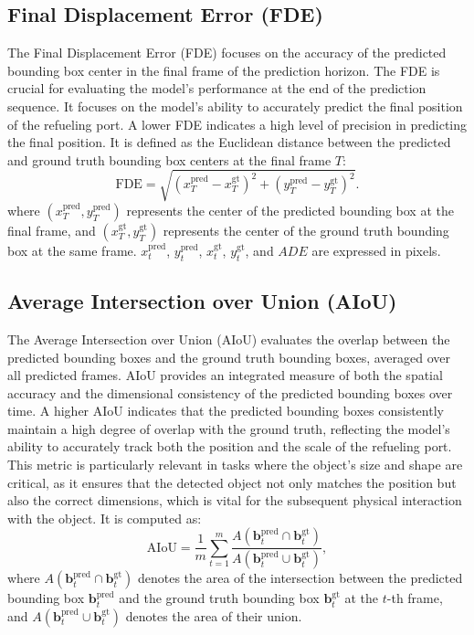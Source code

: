 \documentclass[12pt,oneside]{book} %
\begin{document}
\subsection*{Final Displacement Error (FDE)}
\noindent The Final Displacement Error (FDE) focuses on the accuracy of the predicted
bounding box center in the final frame of the prediction horizon. The FDE is
crucial for evaluating the model’s performance at the end of the prediction
sequence. It focuses on the model’s ability to accurately predict the final
position of the refueling port. A lower FDE indicates a high level of precision
in predicting the final position. It is defined as the Euclidean distance
between the predicted and ground truth bounding box centers at the final frame
\(T\):
\begin{equation}
    \text{FDE} = \sqrt{(x_T^{\text{pred}} - x_T^{\text{gt}})^2 + (y_T^{\text{pred}} - y_T^{\text{gt}})^2}.
\end{equation}
where \((x_T^{\text{pred}}, y_T^{\text{pred}})\) represents the center of the predicted bounding box at the final frame, and \((x_T^{\text{gt}}, y_T^{\text{gt}})\) represents the center of the ground truth bounding box at the same frame.  \(x_t^{\text{pred}}\), \(y_t^{\text{pred}}\), \(x_t^{\text{gt}}\), \(y_t^{\text{gt}}\), and \(ADE\) are expressed in pixels.

\newpage
\subsection*{Average Intersection over Union (AIoU)}
\noindent The Average Intersection over Union (AIoU) evaluates the overlap between the
predicted bounding boxes and the ground truth bounding boxes, averaged over all
predicted frames. AIoU provides an integrated measure of both the spatial
accuracy and the dimensional consistency of the predicted bounding boxes over
time. A higher AIoU indicates that the predicted bounding boxes consistently
maintain a high degree of overlap with the ground truth, reflecting the model’s
ability to accurately track both the position and the scale of the refueling
port. This metric is particularly relevant in tasks where the object’s size and
shape are critical, as it ensures that the detected object not only matches the
position but also the correct dimensions, which is vital for the subsequent
physical interaction with the object. It is computed as:
\begin{equation}
    \text{AIoU} = \frac{1}{m} \sum_{t=1}^{m} \frac{A(\mathbf{b}_t^{\text{pred}} \cap \mathbf{b}_t^{\text{gt}})}{A(\mathbf{b}_t^{\text{pred}} \cup \mathbf{b}_t^{\text{gt}})},
\end{equation}
where \(A(\mathbf{b}_t^{\text{pred}} \cap \mathbf{b}_t^{\text{gt}})\) denotes the area of the intersection between the predicted bounding box \(\mathbf{b}_t^{\text{pred}}\) and the ground truth bounding box \(\mathbf{b}_t^{\text{gt}}\) at the \(t\)-th frame, and \(A(\mathbf{b}_t^{\text{pred}} \cup \mathbf{b}_t^{\text{gt}})\) denotes the area of their union.
\end{document}
